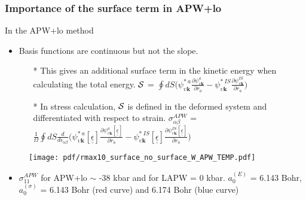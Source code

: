 \documentclass[10pt, handout]{beamer}
\newcommand{\bk}{\bm{k}}
\newcommand{\sig}{\sigma}
\newcommand{\al}{\alpha}
\newcommand{\teps}{\underline{\underline{\epsilon}}}
\newcommand{\nologo}{\setbeamertemplate{logo}{}}  %
\begin{document}
		{\nologo
			\begin{frame}	
				\frametitle{Importance of the surface term in APW+lo}
				\begin{small}					
					In the APW+lo method
					\begin{itemize}
						\item Basis functions are continuous but not the slope.
						\begin{enumerate}
							\item[*] This gives an additional surface term in the kinetic energy when calculating the total energy. {\tiny{ $ \cal S $ =  $ \oint dS \Big( \psi^{*~a}_{\upsilon\bk} \frac{\partial \psi^{a}_{\upsilon\bk}}{\partial r_a}-\psi^{*~IS}_{\upsilon\bk}\frac{\partial \psi^{IS}_{\upsilon\bk}}{\partial r_a} \Big)$  } }
							\normalfont
							\item[*] In stress calculation, $ \cal S $ is defined in the deformed system and differentiated with respect to strain.				
							\tiny {$\sig_{\al\beta}^{APW}$    = $\frac{1}{\Omega}\oint dS\frac{d}{d\epsilon_{\alpha \beta}} \Big( \psi^{*~a}_{\upsilon\bk}[\teps] \frac{\partial \psi^{a}_{\upsilon\bk}[\teps]}{\partial r_a}-\psi^{*~IS}_{\upsilon\bk}[\teps]\frac{\partial \psi^{IS}_{\upsilon\bk}[\teps]}{\partial r_a} \Big)$ }
						\end{enumerate}
					\end{itemize}

					\begin{figure}
						\texttt{[image: pdf/rmax10\_surface\_no\_surface\_W\_APW\_TEMP.pdf]} 
					\end{figure}
				    \begin{itemize}
				    	\item $\sigma^{APW}_{11}$ for APW+lo $\sim$ -38 kbar and for LAPW = 0 kbar.
				    	$a_0^{(E)}$ = 6.143 Bohr, $a_0^{(\sigma)}$ = 6.143 Bohr (red curve) and 6.174 Bohr (blue curve)							    	
				    \end{itemize}
			  \end{small}
			\end{frame}
		}
		
	
\end{document}
